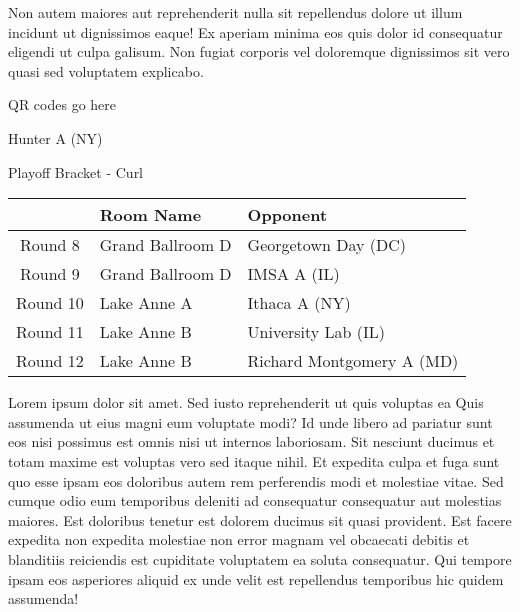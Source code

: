\documentclass{article}%
\begin{document}
\newline%
Non autem maiores aut reprehenderit nulla sit repellendus dolore ut illum incidunt ut dignissimos eaque! Ex aperiam minima eos quis dolor id consequatur eligendi ut culpa galisum. Non fugiat corporis vel doloremque dignissimos sit vero quasi sed voluptatem explicabo.\newline%
\newline%
%
\vspace*{30pt}%
\begin{center}%
\begin{Huge}%
QR codes go here%
\end{Huge}%
\end{center}%
\newpage%
\begin{center}%
\begin{Huge}%
Hunter A (NY)%
\end{Huge}%
\vspace*{8pt}%
\linebreak%
\begin{Large}%
Playoff Bracket {-} Curl%
\end{Large}%
\end{center}%
%
\begin{tabularx}{\textwidth}{|c|Y|Y|}%
\hline%
&Room Name&Opponent\\%
\hline%
Round 8&Grand Ballroom D&Georgetown Day (DC)\\%
Round 9&Grand Ballroom D&IMSA A (IL)\\%
Round 10&Lake Anne A&Ithaca A (NY)\\%
Round 11&Lake Anne B&University Lab (IL)\\%
Round 12&Lake Anne B&Richard Montgomery A (MD)\\%
\hline%
\end{tabularx}%
\vspace*{8pt}%
\linebreak%
\newline%
\newline%
Lorem ipsum dolor sit amet. Sed iusto reprehenderit ut quis voluptas ea Quis assumenda ut eius magni eum voluptate modi? Id unde libero ad pariatur sunt eos nisi possimus est omnis nisi ut internos laboriosam. Sit nesciunt ducimus et totam maxime est voluptas vero sed itaque nihil. Et expedita culpa et fuga sunt quo esse ipsam eos doloribus autem rem perferendis modi et molestiae vitae.\newline%
\newline%
Sed cumque odio eum temporibus deleniti ad consequatur consequatur aut molestias maiores. Est doloribus tenetur est dolorem ducimus sit quasi provident. Est facere expedita non expedita molestiae non error magnam vel obcaecati debitis et blanditiis reiciendis est cupiditate voluptatem ea soluta consequatur. Qui tempore ipsam eos asperiores aliquid ex unde velit est repellendus temporibus hic quidem assumenda!\newline%
\end{document}

